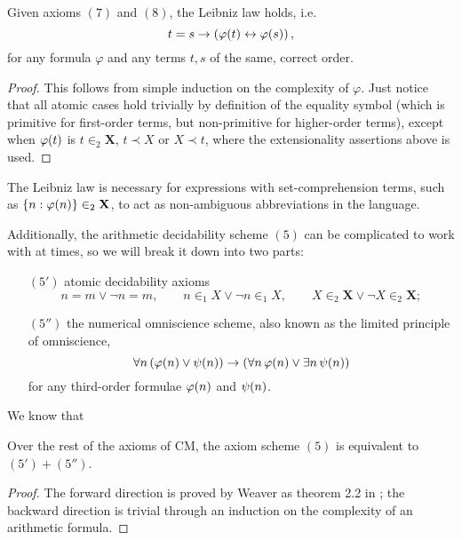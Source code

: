 \documentclass[11pt]{article}
\theoremstyle{plain}
\theoremstyle{definition}
\begin{document}
\begin{proposition}[]
    Given axioms $\left(7\right)$ and $\left(8\right)$, the Leibniz law holds, i.e.
    \[t = s \rightarrow \left(\varphi\mleft(t\mright) \leftrightarrow \varphi\mleft(s\mright)\right),\]
    for any formula $\varphi$ and any terms $t, s$ of the same, correct order.
\end{proposition}

\begin{proof}
    This follows from simple induction on the complexity of $\varphi$. Just notice that all atomic cases hold trivially by definition of the equality symbol (which is primitive for first-order terms, but non-primitive for higher-order terms), except when $\varphi\mleft(t\mright)$ is $t \in_2 \mathbf{X}$, $t \prec X$ or $X \prec t$, where the extensionality assertions above is used.
\end{proof}

The Leibniz law is necessary for expressions with set-comprehension terms, such as $\left\{n : \varphi\mleft(n\mright)\right\} \in_2 \mathbf{X}$, to act as non-ambiguous abbreviations in the language.

Additionally, the arithmetic decidability scheme $\left(5\right)$ can be complicated to work with at times, so we will break it down into two parts:
\begin{enumerate}
    \item[$\left(5'\right)$] atomic decidability axioms
          \[n = m \lor \neg n = m, \qquad n \in_1 X \lor \neg n \in_1 X, \qquad X \in_2 \mathbf{X} \lor \neg X \in_2 \mathbf{X};\]
    \item[$\left(5''\right)$] the numerical omniscience scheme, also known as the limited principle of omniscience,
          \[\forall n \left(\varphi\mleft(n\mright) \lor \psi\mleft(n\mright)\right) \rightarrow \left(\forall n \, \varphi\mleft(n\mright) \lor \exists n \, \psi\mleft(n\mright)\right)\]
          for any third-order formulae $\varphi\mleft(n\mright)$ and $\psi\mleft(n\mright)$.
\end{enumerate}

We know that

\begin{proposition}
    Over the rest of the axioms of $\mathrm{CM}$, the axiom scheme $\left(5\right)$ is equivalent to $\left(5'\right) + \left(5''\right)$.
\end{proposition}

\begin{proof}
    The forward direction is proved by Weaver as theorem 2.2 in \cite{weaver09-cm}; the backward direction is trivial through an induction on the complexity of an arithmetic formula.
\end{proof}
\end{document}
